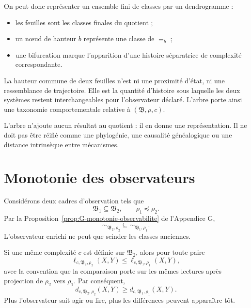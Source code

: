 On peut donc représenter un ensemble fini de classes par un dendrogramme :
\begin{itemize}
\item les feuilles sont les classes finales du quotient ;
\item un nœud de hauteur \(b\) représente une classe de \(\equiv_b\) ;
\item une bifurcation marque l'apparition d'une histoire séparatrice de
complexité correspondante.
\end{itemize}

\begin{encadre}[title={Interprétation --- profondeur commune de décision}]
La hauteur commune de deux feuilles n'est ni une proximité d'état, ni
une ressemblance de trajectoire. Elle est la quantité d'histoire sous
laquelle les deux systèmes restent interchangeables pour l'observateur
déclaré. L'arbre porte ainsi une taxonomie comportementale relative à
\((\mathfrak B,\rho,c)\).
\end{encadre}

L'arbre n'ajoute aucun résultat au quotient : il en donne une
représentation. Il ne doit pas être réifié comme une phylogénie, une
causalité généalogique ou une distance intrinsèque entre mécanismes.

\section{Monotonie des observateurs}
\label{annexe-L-monotonie}

Considérons deux cadres d'observation tels que
\[
\mathfrak B_1\subseteq\mathfrak B_2,
\qquad
\rho_1\preceq\rho_2.
\]
Par la Proposition~\ref{prop:G-monotonie-observabilite} de l'Appendice G,
\[
\sim_{\mathfrak B_2,\rho_2}
\subseteq
\sim_{\mathfrak B_1,\rho_1}.
\]
L'observateur enrichi ne peut que scinder les classes anciennes.

Si une même complexité \(c\) est définie sur \(\mathfrak B_2\), alors
pour toute paire
\begin{equation}
\label{eq:annexe-L-monotonie-ell}
\ell_{c,\mathfrak B_2,\rho_2}(X,Y)
\leq
\ell_{c,\mathfrak B_1,\rho_1}(X,Y),
\end{equation}
avec la convention que la comparaison porte sur les mêmes lectures
après projection de \(\rho_2\) vers \(\rho_1\). Par conséquent,
\[
d_{c,\mathfrak B_2,\rho_2}(X,Y)
\geq
 d_{c,\mathfrak B_1,\rho_1}(X,Y).
\]
Plus l'observateur sait agir ou lire, plus les différences peuvent
apparaître tôt.

